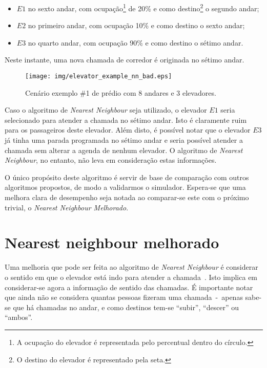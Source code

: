 \begin{itemize}
\item $E1$ no sexto andar, com ocupação\footnote{A ocupação do elevador é representada pelo percentual dentro do círculo.} de 20\% e como destino\footnote{O destino do elevador é representado pela seta.} o segundo andar;
\item $E2$ no primeiro andar, com ocupação 10\% e como destino o sexto andar;
\item $E3$ no quarto andar, com ocupação 90\% e como destino o sétimo andar.
\end{itemize}

Neste instante, uma nova chamada de corredor é originada no sétimo andar.

\begin{figure}[htb!]
  \centering
  \texttt{[image: img/elevator\_example\_nn\_bad.eps]}
  \caption{Cenário exemplo \#1 de prédio com 8 andares e 3 elevadores.}
\label{fig:elevadores:nn:bad}
\end{figure}

Caso o algoritmo de \textit{Nearest Neighbour} seja utilizado, o elevador $E1$
seria selecionado para atender a chamada no sétimo andar. Isto é claramente ruim
para os passageiros deste elevador. Além disto, é possível notar que o elevador
$E3$ já tinha uma parada programada no sétimo andar e seria possível atender a
chamada sem alterar a agenda de nenhum elevador. O algoritmo de \textit{Nearest
Neighbour}, no entanto, não leva em consideração estas informações.

O único propósito deste algoritmo é servir de base de comparação com outros
algoritmos propostos, de modo a validarmos o simulador. Espera-se que uma
melhora clara de desempenho seja notada ao comparar-se este com o próximo
trivial, o \textit{Nearest Neighbour Melhorado}.

\section{\label{sec:ai:nnm}Nearest neighbour melhorado}
Uma melhoria que pode ser feita ao algoritmo de \textit{Nearest Neighbour} é
considerar o sentido em que o elevador está indo para atender a
chamada~\cite{Friese20061908}. Isto implica em considerar-se agora a informação
de sentido das chamadas. É importante notar que ainda não se considera quantas
pessoas fizeram uma chamada~-~apenas sabe-se que há chamadas no andar, e como
destinos tem-se ``subir'', ``descer'' ou ``ambos''.

